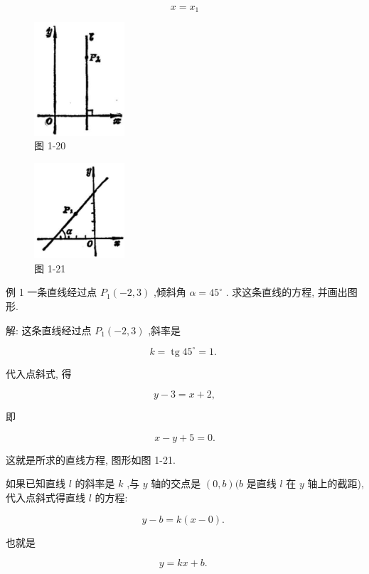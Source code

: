 \documentclass[lang=cn,newtx,10pt,scheme=chinese]{elegantbook}
\begin{document}
\[
  x = {x}_{1}
\]

\begin{figure}[h]
  \centering
  \includegraphics[max width=0.3\textwidth]{images/01912cc2-ffb6-728e-9ae7-b113ff05c64b_24_697633.jpg}
  \caption{图 1-20}
\end{figure}


\begin{figure}[h]
  \centering
  \includegraphics[max width=0.3\textwidth]{images/01912cc2-ffb6-728e-9ae7-b113ff05c64b_24_594823.jpg}
  \caption{图 1-21}
\end{figure}


例 1 一条直线经过点 \({P}_{1}\left( {-2,3}\right)\) ,倾斜角 \(\alpha = {45}^{ \circ }\) . 求这条直线的方程, 并画出图形.

解: 这条直线经过点 \({P}_{1}\left( {-2,3}\right)\) ,斜率是

\[
  k = \operatorname{tg}{45}^{ \circ } = 1\text{. }
\]

代入点斜式, 得

\[
  y - 3 = x + 2,
\]

即

\[
  x - y + 5 = 0.
\]

这就是所求的直线方程, 图形如图 1-21.

如果已知直线 \(l\) 的斜率是 \(k\) ,与 \(y\) 轴的交点是 \(\left( {0,b}\right) (b\) 是直线 \(l\) 在 \(y\) 轴上的截距),代入点斜式得直线 \(l\) 的方程:

\[
  y - b = k\left( {x - 0}\right) \text{. }
\]

也就是

\[
  y = {kx} + b\text{. }
\]
\end{document}
